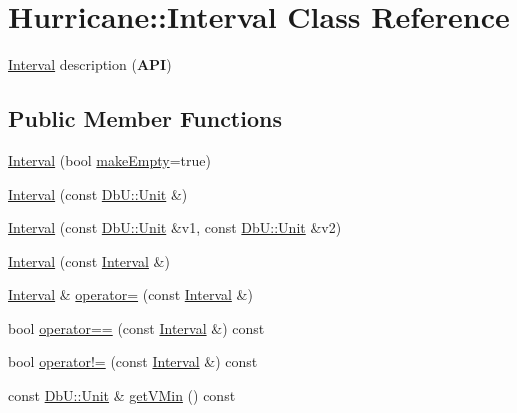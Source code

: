 \hypertarget{classHurricane_1_1Interval}{}\section{Hurricane\+:\+:Interval Class Reference}
\label{classHurricane_1_1Interval}


\mbox{\hyperlink{classHurricane_1_1Interval}{Interval}} description ({\bfseries A\+PI})  


\subsection*{Public Member Functions}
\begin{DoxyCompactItemize}
\item 
\mbox{\hyperlink{classHurricane_1_1Interval_a02b04ad7ca380422098992fa8ff5f546}{Interval}} (bool \mbox{\hyperlink{classHurricane_1_1Interval_a1e171021dcd5c0dc7e8afb0b2324c5ee}{make\+Empty}}=true)
\item 
\mbox{\hyperlink{classHurricane_1_1Interval_ace4173705b4dbcf6c00cd83bb61c4d43}{Interval}} (const \mbox{\hyperlink{group__DbUGroup_ga4fbfa3e8c89347af76c9628ea06c4146}{Db\+U\+::\+Unit}} \&)
\item 
\mbox{\hyperlink{classHurricane_1_1Interval_a35e2ddc881a5b0c3ff8003d52f6298bb}{Interval}} (const \mbox{\hyperlink{group__DbUGroup_ga4fbfa3e8c89347af76c9628ea06c4146}{Db\+U\+::\+Unit}} \&v1, const \mbox{\hyperlink{group__DbUGroup_ga4fbfa3e8c89347af76c9628ea06c4146}{Db\+U\+::\+Unit}} \&v2)
\item 
\mbox{\hyperlink{classHurricane_1_1Interval_a2db3923eb057dd19f5320d93a09750d9}{Interval}} (const \mbox{\hyperlink{classHurricane_1_1Interval}{Interval}} \&)
\item 
\mbox{\hyperlink{classHurricane_1_1Interval}{Interval}} \& \mbox{\hyperlink{classHurricane_1_1Interval_a337b424cea8024f574726c3a2e4935b8}{operator=}} (const \mbox{\hyperlink{classHurricane_1_1Interval}{Interval}} \&)
\item 
bool \mbox{\hyperlink{classHurricane_1_1Interval_a1b022ac0ad975f168ac2b2689e6368c3}{operator==}} (const \mbox{\hyperlink{classHurricane_1_1Interval}{Interval}} \&) const
\item 
bool \mbox{\hyperlink{classHurricane_1_1Interval_a2e5a64c485269fb08fb762e1eb3bc374}{operator!=}} (const \mbox{\hyperlink{classHurricane_1_1Interval}{Interval}} \&) const
\item 
const \mbox{\hyperlink{group__DbUGroup_ga4fbfa3e8c89347af76c9628ea06c4146}{Db\+U\+::\+Unit}} \& \mbox{\hyperlink{classHurricane_1_1Interval_a6e0deb1b38065375a78c7fd6885b5909}{get\+V\+Min}} () const

\end{DoxyCompactItemize}
